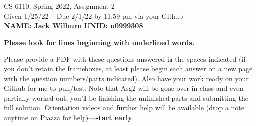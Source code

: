 \documentclass[11pt]{article}
\begin{document}



\begin{center}
\begin{large}
  CS 6110, Spring 2022, Assignment 2  \\
  Given 1/25/22 -- Due 2/1/22 by 11:59 pm via your Github 
  \ \\
    {  {\Large\bf NAME: Jack Wilburn} \hfill {\Large\bf UNID: u0999308}\hspace{4cm} }
          \ \\
\end{large}

\end{center}

 {\bf Please look for lines beginning with underlined words.}

Please provide a PDF with these questions answered
in the spaces indicated (if you don't retain the frameboxes,
at least please begin each answer on a new page
with the question numbers/parts indicated).
Also have your work ready on your Github for me to pull/test.
%
Note that Asg2 will be gone over in class and even partially
worked out; you'll be finishing the unfinished parts and submitting
the full solution.
%
Orientation videos and further help will be available (drop a note anytime
on Piazza for help)---{\bf start early}.
\end{document}
